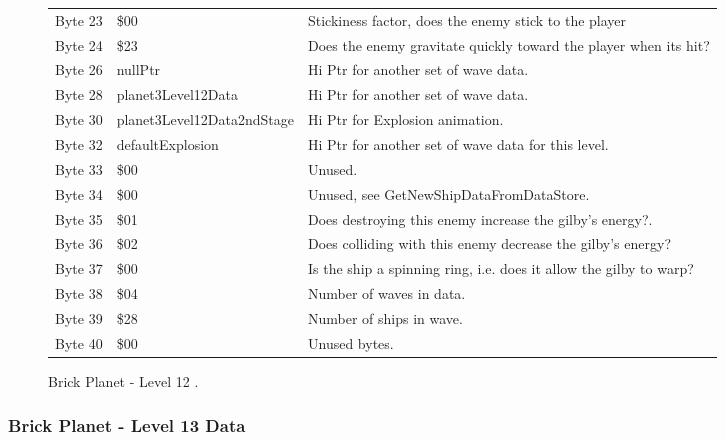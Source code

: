 \begin{figure}[H]
{\begin{adjustbox}{width=12cm}
\begin{tabular}{lll}
 Byte 23 & \$00                        & Stickiness factor, does the enemy stick to the player              \\
 Byte 24 & \$23                        & Does the enemy gravitate quickly toward the player when its hit?   \\
 Byte 26 & nullPtr                    & Hi Ptr for another set of wave data.                               \\
 Byte 28 & planet3Level12Data         & Hi Ptr for another set of wave data.                               \\
 Byte 30 & planet3Level12Data2ndStage & Hi Ptr for Explosion animation.                                    \\
 Byte 32 & defaultExplosion           & Hi Ptr for another set of wave data for this level.                \\
 Byte 33 & \$00                        & Unused.                                                            \\
 Byte 34 & \$00                        & Unused, see GetNewShipDataFromDataStore.                           \\
 Byte 35 & \$01                        & Does destroying this enemy increase the gilby's energy?.           \\
 Byte 36 & \$02                        & Does colliding with this enemy decrease the gilby's energy?        \\
 Byte 37 & \$00                        & Is the ship a spinning ring, i.e. does it allow the gilby to warp? \\
 Byte 38 & \$04                        & Number of waves in data.                                           \\
 Byte 39 & \$28                        & Number of ships in wave.                                           \\
 Byte 40 & \$00                        & Unused bytes.                                                      \\
\bottomrule
\end{tabular}

  \end{adjustbox}

  }\caption*{Brick Planet - Level 12
.}
\end{figure}

\clearpage
\subsubsection{Brick Planet - Level 13 Data}

